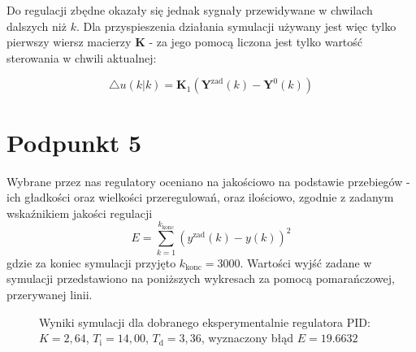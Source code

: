 Do regulacji zbędne okazały się jednak sygnały przewidywane w chwilach dalszych niż $k$. Dla przyspieszenia działania symulacji używany jest więc tylko pierwszy wiersz macierzy $\boldsymbol{K}$ - za jego pomocą liczona jest tylko wartość sterowania w chwili aktualnej:

\begin{equation}
	\triangle u(k|k) = \boldsymbol{K}_1 (\boldsymbol{Y}^{\mathrm{zad}}(k) - \boldsymbol{Y}^{0}(k))
\end{equation}

\chapter{Podpunkt 5}
Wybrane przez nas regulatory oceniano na jakościowo na podstawie przebiegów - ich gładkości oraz wielkości przeregulowań, oraz ilościowo, zgodnie z zadanym wskaźnikiem jakości regulacji
\begin{equation}
E = \sum_{k=1}^{k_{\mathrm{konc}}}(y^{\mathrm{zad}}(k) - y(k))^2
\label{E}
\end{equation}
gdzie za koniec symulacji przyjęto $k_{\mathrm{konc}}=3000$. Wartości wyjść zadane w symulacji przedstawiono na poniższych wykresach za pomocą pomarańczowej, przerywanej linii.

\begin{figure}[ht]
\centering
{}
\caption{Wyniki symulacji dla dobranego eksperymentalnie regulatora PID: \\$K = 2,64$, $T_{\mathrm{i}}=14,00$, $T_{\mathrm{d}}=3,36$, wyznaczony błąd $E=\num{19,6632}$}
\label{Z5manualPID}
\end{figure}


